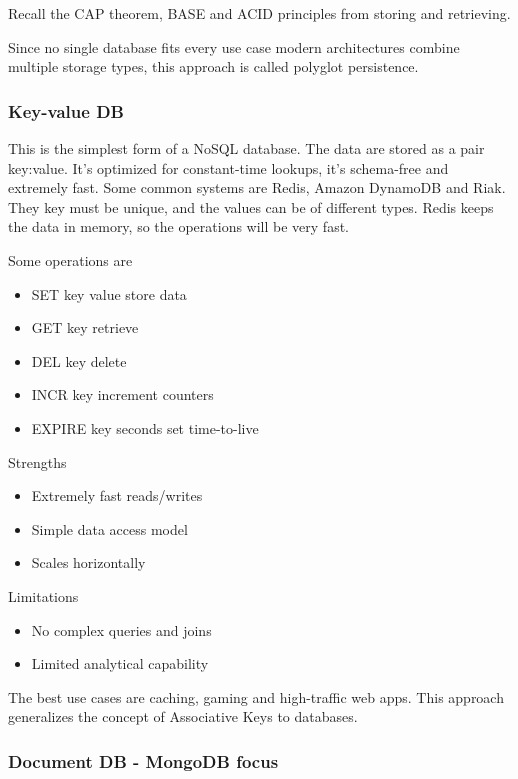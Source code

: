 Recall the CAP theorem, BASE and ACID principles from storing and retrieving. 

\vspace{10pt}

Since no single database fits every use case modern architectures combine multiple storage types, this approach is called polyglot persistence. 


\subsubsection{Key-value DB}


This is the simplest form of a NoSQL database. The data are stored as a pair key:value. It's optimized for constant-time lookups, it's schema-free and extremely fast. Some common systems are Redis, Amazon DynamoDB and Riak. They key must be unique, and the values can be of different types. Redis keeps the data in memory, so the operations will be very fast. 

Some operations are 

\begin{itemize}
    \item SET key value \ra store data
    \item GET key \ra retrieve
    \item DEL key \ra delete
    \item INCR key \ra increment counters
    \item EXPIRE key seconds \ra set time-to-live 
\end{itemize}


Strengths
\begin{itemize}
    \item Extremely fast reads/writes
    \item Simple data access model
    \item Scales horizontally
\end{itemize}

Limitations
\begin{itemize}
    \item No complex queries and joins
    \item Limited analytical capability
\end{itemize}

The best use cases are caching, gaming and high-traffic web apps. This approach generalizes the concept of Associative Keys to databases.




\subsubsection{Document DB - MongoDB focus}

